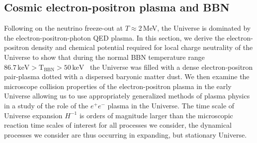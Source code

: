\subsection{Cosmic electron-positron plasma and BBN}
\label{section:electron}
Following on the neutrino freeze-out at $T\approx 2$\,MeV, the Universe is dominated by the electron-positron-photon QED plasma. In this section, we derive the electron-positron density and chemical potential required for local charge neutrality of the Universe to show that during the normal BBN temperature range $86.7\,\mathrm{keV}>\mathrm{T_{BBN}}>50\,\mathrm{keV}$~\cite{Pitrou:2018cgg} the Universe was filled with a dense electron-positron pair-plasma dotted with a dispersed baryonic matter dust. We then examine the microscope collision properties of the electron-positron plasma in the early Universe allowing us to use  appropriately generalized methods of plasma physics in a study of the role of the $e^+e^-$ plasma in the Universe. The time scale of Universe expansion $H^{-1}$ is orders of magnitude larger than the microscopic reaction time scales of interest for all processes we consider, the dynamical processes we consider are  thus occurring in expanding, but stationary Universe.

